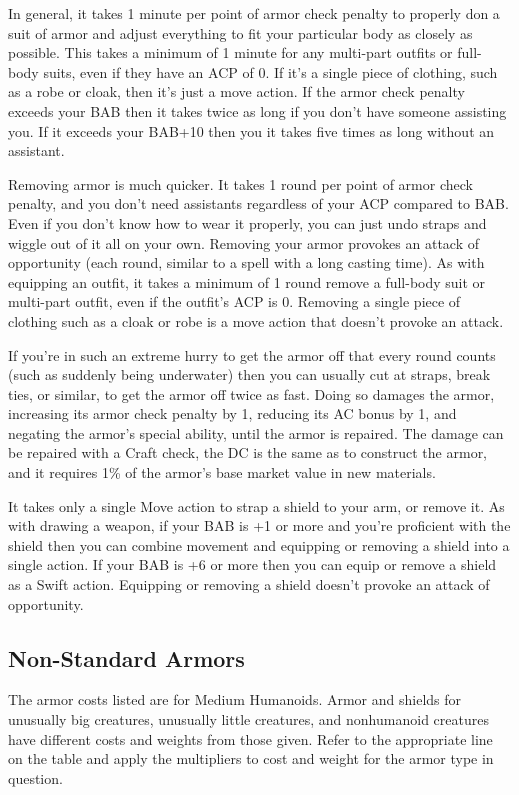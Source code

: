 In general, it takes 1 minute per point of armor check penalty to properly don a suit of armor and adjust everything to fit your particular body as closely as possible. This takes a minimum of 1 minute for any multi-part outfits or full-body suits, even if they have an ACP of 0. If it's a single piece of clothing, such as a robe or cloak, then it's just a move action. If the armor check penalty exceeds your BAB then it takes twice as long if you don't have someone assisting you. If it exceeds your BAB+10 then you it takes five times as long without an assistant.

Removing armor is much quicker. It takes 1 round per point of armor check penalty, and you don't need assistants regardless of your ACP compared to BAB. Even if you don't know how to wear it properly, you can just undo straps and wiggle out of it all on your own. Removing your armor provokes an attack of opportunity (each round, similar to a spell with a long casting time). As with equipping an outfit, it takes a minimum of 1 round remove a full-body suit or multi-part outfit, even if the outfit's ACP is 0. Removing a single piece of clothing such as a cloak or robe is a move action that doesn't provoke an attack.

If you're in such an extreme hurry to get the armor off that every round counts (such as suddenly being underwater) then you can usually cut at straps, break ties, or similar, to get the armor off twice as fast. Doing so damages the armor, increasing its armor check penalty by 1, reducing its AC bonus by 1, and negating the armor's special ability, until the armor is repaired. The damage can be repaired with a Craft check, the DC is the same as to construct the armor, and it requires 1\% of the armor's base market value in new materials.

It takes only a single Move action to strap a shield to your arm, or remove it. As with drawing a weapon, if your BAB is +1 or more and you're proficient with the shield then you can combine movement and equipping or removing a shield into a single action. If your BAB is +6 or more then you can equip or remove a shield as a Swift action. Equipping or removing a shield doesn't provoke an attack of opportunity.

\subsection{Non-Standard Armors}

The armor costs listed are for Medium Humanoids. Armor and shields for unusually big creatures, unusually little creatures, and nonhumanoid creatures have different costs and weights from those given. Refer to the appropriate line on the table and apply the multipliers to cost and weight for the armor type in question.

